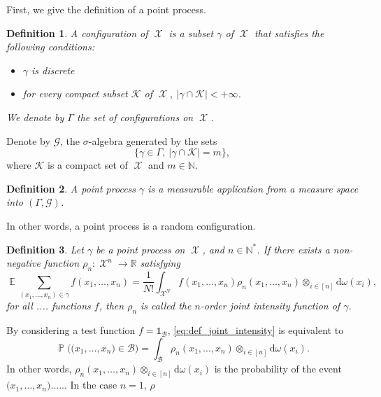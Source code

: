 \documentclass[twoside,11pt]{book}
\newtheorem{definition}{Definition}
\numberwithin{theorem}{chapter}
\numberwithin{definition}{chapter}
\numberwithin{proposition}{chapter}
\numberwithin{corollary}{chapter}
\numberwithin{example}{chapter}
\numberwithin{lemma}{chapter}
\DeclareMathOperator{\EX}{\mathbb{E}}
\DeclareMathOperator{\Prb}{\mathbb{P}}
\DeclareMathOperator{\X}{\mathcal{X}}
\begin{document}
First, we give the definition of a point process. 

\begin{definition}
A configuration of $\X$ is a subset $\gamma$ of $\X$ that satisfies the following conditions:
\begin{itemize}
\item $\gamma$ is discrete 
\item for every compact subset $\mathcal{K}$ of $\X, \: |\gamma \cap \mathcal{K}| < +\infty $.

\end{itemize}
We denote by $\Gamma$ the set of configurations on $\X$.
\end{definition}

Denote by $\mathcal{G}$, the $\sigma$-algebra generated by the sets 
\begin{equation}
\{\gamma \in \Gamma, \: |\gamma \cap \mathcal{K}| = m \},
\end{equation}
where $\mathcal{K}$ is a compact set of $\X$ and $m \in \mathbb{N}$.



\begin{definition}
A point process $\gamma$ is a measurable application from a measure space into $(\Gamma, \mathcal{G})$.
\end{definition}

In other words, a point process is a random configuration.  

\begin{definition}
Let $\gamma$ be a point process on $\X$, and $n \in \mathbb{N}^{*}$. If there exists a non-negative function $\rho_{n}: \X^{n} \rightarrow \mathbb{R} $ satisfying 
\begin{equation}\label{eq:def_joint_intensity}
\EX \sum\limits_{(x_{1}, \dots, x_{n}) \in \gamma } f(x_{1}, \dots, x_{n}) = \frac{1}{N!} \int_{\X^{N}} f(x_{1}, \dots, x_{n}) \rho_{n}(x_{1}, \dots, x_{n}) \otimes_{i \in [n]} \mathrm{d}\omega(x_{i}),
\end{equation}
for all .... functions $f$, then $\rho_{n}$ is called the $n$-order joint intensity function of $\gamma$.
\end{definition}
By considering a test function $f = \mathbb{1}_{\mathcal{B}}$, \eqref{eq:def_joint_intensity} is equivalent to 
\begin{equation}
\Prb \bigg(\big(x_{1}, \dots, x_{n} \big) \in \mathcal{B} \bigg) = \int_{\mathcal{B}} \rho_{n}(x_{1}, \dots, x_{n}) \otimes_{i \in [n]}\mathrm{d}\omega(x_{i}).
\end{equation}
In other words, $\rho_{n}(x_{1}, \dots, x_{n}) \otimes_{i \in [n]}\mathrm{d}\omega(x_{i})$ is the probability of the event $\big(x_{1}, \dots, x_{n} \big)...$...
In the case $n = 1$, $\rho$
\end{document}
